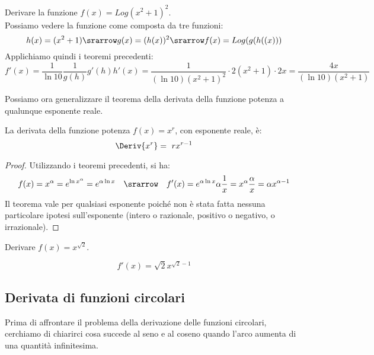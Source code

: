 \begin{esempio}
Derivare la funzione \(f(x)=Log(x^2+1)^2\).\\

Possiamo vedere la funzione come composta da tre funzioni:
\[h(x)=(x^2+1) \srarrow g(x)=(h(x))^2\srarrow f(x)=Log(g(h((x)))\]
Applichiamo quindi i teoremi precedenti:
\[f'(x) =
\dfrac{1}{\ln 10}
\dfrac{1}{g(h)}g'(h) h'(x)=
\dfrac{1}{(\ln 10)(x^2+1)^2} \cdot 2(x^2+1) \cdot 2x =
\dfrac{4x}{(\ln 10)(x^2+1)}\]
\end{esempio}


Possiamo ora generalizzare il teorema della derivata della funzione potenza 
a qualunque esponente reale.

\begin{teorema}
\label{teo:diff01_deri_x_alla_r}
La derivata della funzione potenza \(f(x)= x^r\), con esponente 
reale, è: 
\[\Deriv{x^r}=~rx^{r-1}\]
\end{teorema}

\begin{proof}
Utilizzando i teoremi precedenti, si ha:
\[f(x) = x^\alpha= e^{\ln x^\alpha}=e^{\alpha\ln x} \quad \srarrow \quad 
f'(x)=e^{\alpha\ln x}\alpha\dfrac{1}{x}=x^\alpha\dfrac{\alpha}{x}=
\alpha x^{\alpha-1}\]
Il teorema vale per qualsiasi esponente poiché non è stata fatta nessuna 
particolare ipotesi sull'esponente 
(intero o razionale, positivo o negativo, o irrazionale).
\end{proof}

\begin{esempio}
Derivare \(f(x)=x^{\sqrt{2}}\).

\[f'(x)=\sqrt{2}x^{\sqrt{2}-1}\]
\end{esempio}

\subsection{Derivata di funzioni circolari}
\label{subsec:differenziazione_circolari}

Prima di affrontare il problema della derivazione delle funzioni 
circolari, cerchiamo di chiarirci cosa succede al seno e al coseno 
quando l'arco aumenta di una quantità infinitesima.

